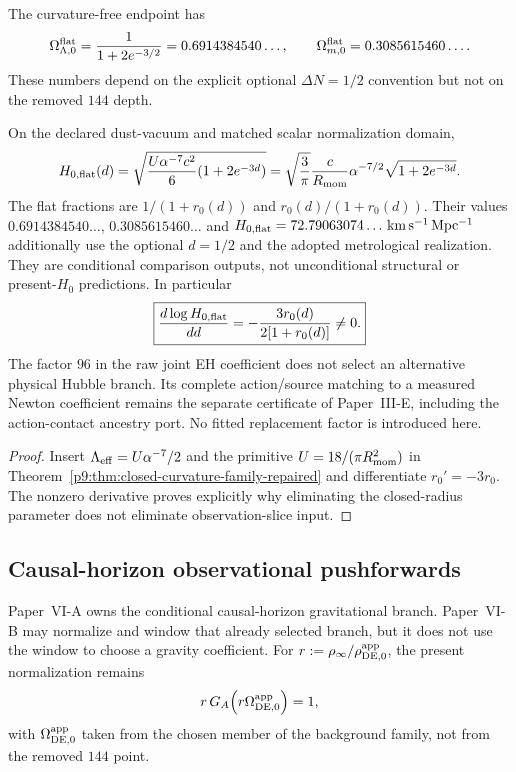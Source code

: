 \documentclass[12pt,a4paper]{article}
\begin{document}
\begin{corollary}
\label{p9:cor:flat-clock-fractions}
The curvature-free endpoint has
\[
\Omega_{\Lambda,0}^{\rm flat}
=\frac1{1+2e^{-3/2}}=0.6914384540\ldots,
\qquad
\Omega_{m,0}^{\rm flat}=0.3085615460\ldots .
\]
These numbers depend on the explicit optional \(\Delta N=1/2\) convention but not on the
removed \(144\) depth.
\end{corollary}

\begin{corollary}
\label{p9:cor:kappaU-H0-calibration-status}
On the declared dust-vacuum and matched scalar normalization domain,
\[
 H_{0,\rm flat}(d)=\sqrt{\frac{U\alpha^{-7}c^2}{6}
 (1+2e^{-3d})}
 =\sqrt{\frac3\pi}\frac c{R_{\rm mom}}\alpha^{-7/2}
 \sqrt{1+2e^{-3d}}.
\]
The flat fractions are $1/(1+r_0(d))$ and $r_0(d)/(1+r_0(d))$.
Their values $0.6914384540\ldots$, $0.3085615460\ldots$ and
$H_{0,\rm flat}=72.79063074\ldots\,
\mathrm{km\,s^{-1}\,Mpc^{-1}}$ additionally use the optional $d=1/2$
and the adopted metrological realization. They are conditional
comparison outputs, not unconditional structural or present-$H_0$
predictions. In particular
\[
 \boxed{\frac{d\log H_{0,\rm flat}}{dd}
 =-\frac{3r_0(d)}{2[1+r_0(d)]}\ne0.}
\]
The factor $96$ in the raw joint EH coefficient does not select an
alternative physical Hubble branch. Its complete action/source matching
to a measured Newton coefficient remains the separate certificate of
Paper~III-E, including the action-contact ancestry port. No fitted
replacement factor is introduced here.
\end{corollary}
\begin{proof}
Insert $\Lambda_{\rm eff}=U\alpha^{-7}/2$ and the primitive
$U=18/(\pi R_{\rm mom}^2)$ in
Theorem~\ref{p9:thm:closed-curvature-family-repaired} and differentiate
$r_0'= -3r_0$. The nonzero derivative proves explicitly why eliminating
the closed-radius parameter does not eliminate observation-slice input.
\end{proof}

\subsection{Causal-horizon observational pushforwards}
\label{p9:app:horizon-supported-relaxation}
Paper~VI-A owns the conditional causal-horizon gravitational branch.  Paper~VI-B
may normalize and window that already selected branch, but it does not use the
window to choose a gravity coefficient.  For
\(r:=\rho_\infty/\rho_{\rm DE,0}^{\rm app}\), the present normalization remains
\begin{equation}
\label{p9:eq:hs-r-normalization}
r\,G_A\!\left(r\Omega_{\rm DE,0}^{\rm app}\right)=1,
\end{equation}
with \(\Omega_{\rm DE,0}^{\rm app}\) taken from the chosen member of the
background family, not from the removed \(144\) point.
\end{document}
